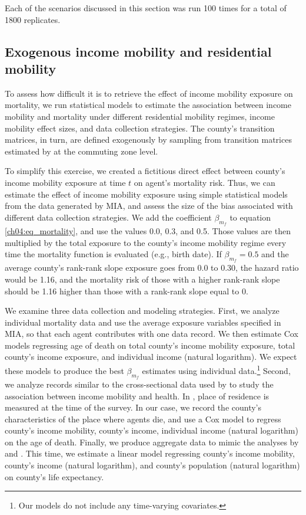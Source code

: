 \documentclass[class=article, crop=false, 12pt]{standalone}
\begin{document}
Each of the scenarios discussed in this section was run 100 times for a total of 1800 replicates. 



\subsection{Exogenous income mobility and residential mobility}

To assess how difficult it is to retrieve the effect of income mobility exposure on mortality, we run statistical models to estimate the association between income mobility and mortality under different residential mobility regimes, income mobility effect sizes, and data collection strategies. The county's transition matrices, in turn, are defined exogenously by sampling from transition matrices estimated by \citet{chetty2014} at the commuting zone level.

To simplify this exercise, we created a fictitious direct effect between county's income mobility exposure at time $t$ on agent's mortality risk. Thus, we can estimate the effect of income mobility exposure using simple statistical models from the data generated by MIA, and assess the size of the bias associated with different data collection strategies. We add the coefficient $\beta_{m_{f}}$ to equation \ref{ch04:eq_mortality}, and use the values 0.0, 0.3, and 0.5. Those values are then multiplied by the total exposure to the county's income mobility regime every time the mortality function is evaluated (e.g., birth date). If  $\beta_{m_{f}} = 0.5$ and the average county's rank-rank slope exposure goes from 0.0 to 0.30, the hazard ratio would be 1.16, and the mortality risk of those with a higher rank-rank slope should be 1.16 higher than those with a rank-rank slope equal to 0.

We examine three data collection and modeling strategies. First, we analyze individual mortality data and use the average exposure variables specified in MIA, so that each agent contributes with one data record. We then estimate Cox models regressing age of death on total county's income mobility exposure, total county's income exposure, and individual income (natural logarithm). We expect these models to produce the best $\beta_{m_{f}}$ estimates using individual data.\footnote{Our models do not include any time-varying covariates.} Second, we analyze records similar to the cross-sectional data used by \citet{venkataramani2016} to study the association between income mobility and health. In \citet{venkataramani2016}, place of residence is measured at the time of the survey. In our case, we record the county's characteristics of the place where agents die, and use a Cox model to regress county's income mobility, county's income, individual income (natural logarithm) on the age of death. Finally, we produce aggregate data to mimic the analyses by \citet{venkataramani2015} and \citet{daza2018a}. This time, we estimate a linear model regressing county's income mobility, county's income (natural logarithm), and county's population (natural logarithm) on county's life expectancy. 
\end{document}
